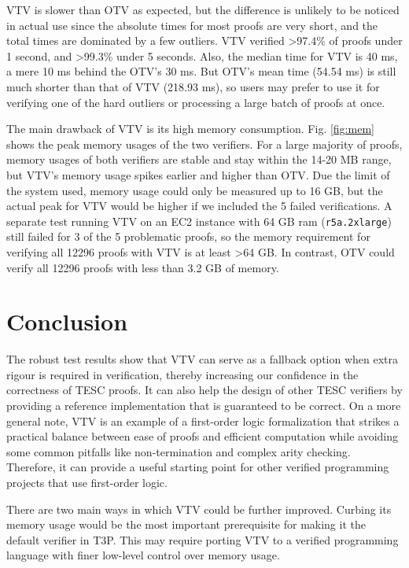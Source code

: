 \documentclass{lipics-v2021}
\begin{document}


VTV is slower than OTV as expected, but the difference is unlikely to be noticed 
in actual use since the absolute times for most proofs are very short, and the 
total times are dominated by a few outliers. 
VTV verified >97.4\% of proofs under 1 second, and >99.3\% under 5 seconds. 
Also, the median time for VTV is 40 ms, a mere 10 ms behind the OTV's 30 ms. 
But OTV's mean time (54.54 ms) is still much shorter than that of VTV (218.93 ms),
so users may prefer to use it for verifying one of the hard outliers or processing
a large batch of proofs at once.

The main drawback of VTV is its high memory consumption. Fig. \ref{fig:mem} shows
the peak memory usages of the two verifiers. For a large majority of proofs, 
memory usages of both verifiers are stable and stay within the 14-20 MB range,
but VTV's memory usage spikes earlier and higher than OTV. Due the limit of the system 
used, memory usage could only be measured up to 16 GB, but the actual peak for VTV 
would be higher if we included the 5 failed verifications. A separate test running 
VTV on an EC2 instance with 64 GB ram (\texttt{r5a.2xlarge}) still failed for 3 of 
the 5 problematic proofs, so the memory requirement for verifying all 12296 proofs 
with VTV is at least >64 GB. In contrast, OTV could verify all 
12296 proofs with less than 3.2 GB of memory.



\section{Conclusion}  \label{sec:conclusion}

The robust test results show that VTV can serve as a fallback option when extra rigour 
is required in verification, thereby increasing our confidence in the correctness of TESC proofs. 
It can also help the design of other TESC verifiers by providing a reference implementation 
that is guaranteed to be correct. On a more general note, VTV is an example of a first-order logic 
formalization that strikes a practical balance between ease of proofs and efficient computation 
while avoiding some common pitfalls like non-termination and complex arity checking. 
Therefore, it can provide a useful starting point for other verified programming projects 
that use first-order logic.

There are two main ways in which VTV could be further improved. Curbing its 
memory usage would be the most important prerequisite for making it the 
default verifier in T3P. This may require porting VTV to a verified programming
language with finer low-level control over memory usage. 
\end{document}
